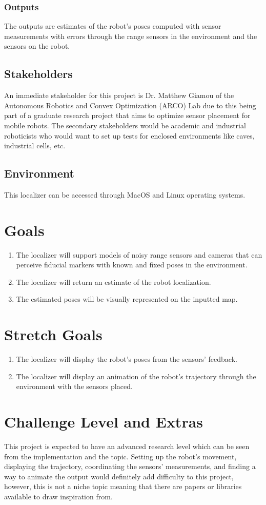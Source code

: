 \documentclass{article}
\begin{document}
\subsubsection{Outputs}
The outputs are estimates of the robot's poses computed with sensor measurements with errors through the range sensors in the environment and the sensors on the robot.

\subsection{Stakeholders}
An immediate stakeholder for this project is Dr. Matthew Giamou of the Autonomous Robotics and Convex Optimization (ARCO) Lab due to this being part of a graduate research project that aims to optimize sensor placement for mobile robots. The secondary stakeholders would be academic and industrial roboticists who would want to set up tests for enclosed environments like caves, industrial cells, etc.

\subsection{Environment}
This localizer can be accessed through MacOS and Linux operating systems.

\section{Goals}
\begin{enumerate}
    \item The localizer will support models of noisy range sensors and cameras that can perceive fiducial markers with known and fixed poses in the environment.
    \item The localizer will return an estimate of the robot localization.
    \item The estimated poses will be visually represented on the inputted map.
\end{enumerate} 

\section{Stretch Goals}
\begin{enumerate}           
    \item The localizer will display the robot's poses from the sensors' feedback.
    \item The localizer will display an animation of the robot's trajectory through the environment with the sensors placed.
\end{enumerate}

\section{Challenge Level and Extras}
This project is expected to have an advanced research level which can be seen from the implementation and the topic. Setting up the robot's movement, displaying the trajectory, coordinating the sensors' measurements, and finding a way to animate the output would definitely add difficulty to this project, however, this is not a niche topic meaning that there are papers or libraries available to draw inspiration from.

\newpage{}
\end{document}

